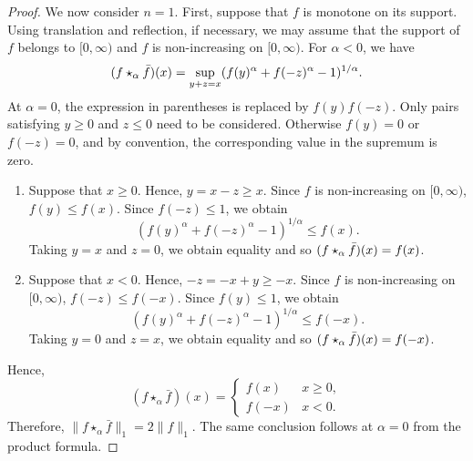\documentclass[11pt]{amsart}
\theoremstyle{plain}
\theoremstyle{definition}
\theoremstyle{remark}
\begin{document}
\begin{proof}
    We now consider $n=1$.  First, suppose that  $f$ is monotone on its support. Using translation and reflection, if necessary, we may assume that the support of $f$ belongs to $[0, \infty)$ and $f$ is non-increasing on $[0, \infty)$. For $\alpha <0$,
    we have
    \begin{equation}
    \label{eq:explicit-form-some-alpha-sum-in-pf}
        (f \star_\alpha \Bar f) (x)
        =\sup_{ y +z =x } (f(y)^\alpha + f(-z)^\alpha -1)^{1/\alpha}
        .
    \end{equation}
    At $\alpha=0$, the expression in parentheses is replaced by $f(y) f(-z)$. Only pairs satisfying $y \geq 0$ and $z \leq 0$ need to be considered. Otherwise $f(y) = 0$ or $f(-z) = 0$, and by convention, the corresponding value in the supremum is zero.
\begin{enumerate}[wide =0pt, labelwidth= .9cm, leftmargin=1.55cm, label=\textbf{Case \arabic*}:]
        \item Suppose that $x \geq 0$. Hence, $ y = x-z \geq x$. Since $f$ is non-increasing on $[0,\infty)$, $f(y) \leq f(x).$ Since $f(-z) \leq 1$, we obtain
    \[
        (f(y)^\alpha + f(-z)^\alpha -1)^{1/\alpha} \leq f(x).
    \]
    Taking $y= x$ and $z= 0$, we obtain equality and so $(f \star_\alpha \Bar f) (x) = f(x)$.
    \item Suppose that $x < 0$. Hence, $ -z = -x+y \geq -x$. Since $f$ is non-increasing on $[0,\infty)$, $f(-z) \leq f(-x).$ Since $f(y) \leq 1$, we obtain
    \[
        (f(y)^\alpha + f(-z)^\alpha -1)^{1/\alpha} \leq f(-x).
    \]
    Taking $y= 0$ and $z= x$, we obtain equality and so $(f \star_\alpha \Bar f) (x) = f(-x)$.
    \end{enumerate}
    Hence,
    \[
        (f  \star_\alpha \bar f) (x) = \begin{cases}
            f(x) & x\geq 0,
            \\
            f(-x) & x< 0.
        \end{cases}
    \]
    Therefore, $\|f \star_\alpha \bar{f}\|_1=2\|f\|_1$. The same conclusion follows at $\alpha=0$ from the product formula.


\end{proof}
\end{document}
